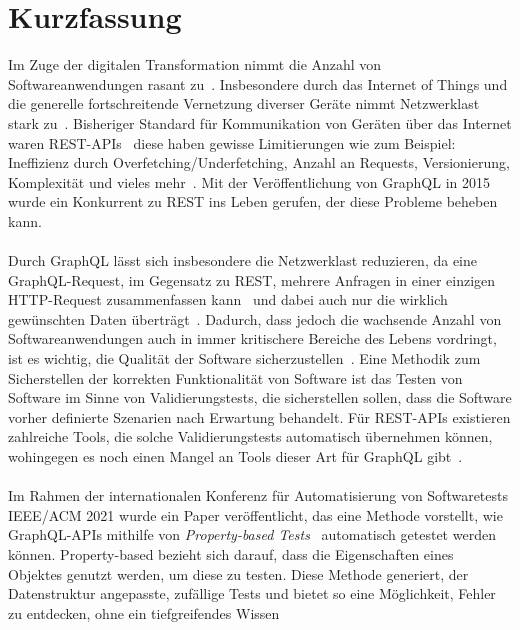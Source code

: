\chapter{Kurzfassung}

Im Zuge der digitalen Transformation nimmt die Anzahl von Softwareanwendungen rasant zu~\cite{digitale-transformation}.
Insbesondere durch das Internet of Things und die generelle fortschreitende Vernetzung diverser Geräte nimmt Netzwerklast stark zu~\cite{iot-traffic}.
Bisheriger Standard für Kommunikation von Geräten über das Internet waren REST-APIs~\cite[vgl. Introduction]{hygraph} diese haben gewisse
Limitierungen wie zum Beispiel: Ineffizienz durch Overfetching/Underfetching, Anzahl an Requests, Versionierung, Komplexität und vieles mehr~\cite{hygraph}.
Mit der Veröffentlichung von GraphQL in 2015 wurde ein Konkurrent zu REST ins Leben gerufen, der diese Probleme beheben kann.
\\
\\
Durch GraphQL lässt sich insbesondere die Netzwerklast reduzieren, da eine GraphQL-Request, im Gegensatz zu REST, mehrere Anfragen in einer einzigen HTTP-Request zusammenfassen kann~\cite{awsrestgraphql}
und dabei auch nur die wirklich gewünschten Daten überträgt~\cite[vgl. Advantages of GraphQL APIs]{hygraph}.
Dadurch, dass jedoch die wachsende Anzahl von Softwareanwendungen auch in immer kritischere Bereiche des Lebens vordringt, ist es wichtig, die Qualität der Software sicherzustellen~\cite[S. 16]{software-testing}.
Eine Methodik zum Sicherstellen der korrekten Funktionalität von Software ist das Testen von Software im Sinne von Validierungstests, die sicherstellen sollen, dass die Software vorher definierte Szenarien nach Erwartung behandelt.
Für REST-APIs existieren zahlreiche Tools, die solche Validierungstests automatisch übernehmen können, wohingegen es noch einen Mangel an Tools dieser Art für GraphQL gibt~\cite[vgl. Introduction]{property-based-testing}.
\\
\\
Im Rahmen der internationalen Konferenz für Automatisierung von Softwaretests IEEE/ACM 2021 wurde ein Paper veröffentlicht, das eine Methode vorstellt, wie GraphQL-APIs mithilfe von
\textit{Property-based Tests}~\cite{property-based-testing} automatisch getestet werden können.
Property-based bezieht sich darauf, dass die Eigenschaften eines Objektes genutzt werden, um diese zu testen.
Diese Methode generiert, der Datenstruktur angepasste, zufällige Tests und bietet so eine Möglichkeit, Fehler zu entdecken, ohne ein tiefgreifendes Wissen
